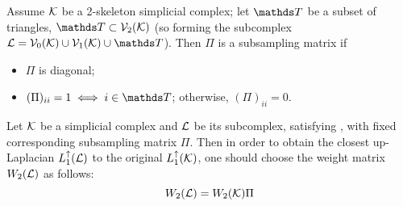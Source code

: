 \begin{definition}
      Assume \( \mathcal{K} \) be a 2-skeleton simplicial complex;  let \( \ds T \) be a subset of triangles, \( \ds T \subset \V 2 \) (so forming the subcomplex \(\mc L = \V 0 \cup \V 1 \cup \ds T \)). Then \( \Pi \) is a subsampling matrix if 
      \begin{itemize}[leftmargin = 45pt]
            \item \( \Pi \) is diagonal;
            \item \( ( \Pi )_{ii} = 1  \iff i \in \ds T \); otherwise, \( ( \Pi )_{ii} = 0 \).
      \end{itemize}
\end{definition}

\begin{lemma}\label{lemma:subsample_weight}
      Let \( \mathcal{K} \) be a simplicial complex and \( \mathcal{L} \) be its subcomplex, satisfying , with fixed corresponding subsampling matrix \( \Pi \). Then in order to obtain the closest up-Laplacian \( L_{1}^{\uparrow}(\mathcal{L})\) to the original \( L_{1}^{\uparrow}(\mathcal{K})\), one should choose the weight matrix \( W_2(\mathcal{L} )\) as follows:
      \begin{equation*}
            W_2 ( \mathcal{L} ) = W_2( \mathcal{K})  \Pi
      \end{equation*}
\end{lemma}

